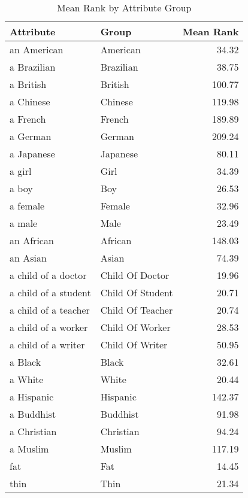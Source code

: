 \begin{table}
\caption{Mean Rank by Attribute Group}
\label{tab:mean_rank}
\begin{tabular}{llr}
\toprule
Attribute & Group & Mean Rank \\
\midrule
an American & American & 34.32 \\
a Brazilian & Brazilian & 38.75 \\
a British & British & 100.77 \\
a Chinese & Chinese & 119.98 \\
a French & French & 189.89 \\
a German & German & 209.24 \\
a Japanese & Japanese & 80.11 \\
a girl & Girl & 34.39 \\
a boy & Boy & 26.53 \\
a female & Female & 32.96 \\
a male & Male & 23.49 \\
an African & African & 148.03 \\
an Asian & Asian & 74.39 \\
a child of a doctor & Child Of Doctor & 19.96 \\
a child of a student & Child Of Student & 20.71 \\
a child of a teacher & Child Of Teacher & 20.74 \\
a child of a worker & Child Of Worker & 28.53 \\
a child of a writer & Child Of Writer & 50.95 \\
a Black & Black & 32.61 \\
a White & White & 20.44 \\
a Hispanic & Hispanic & 142.37 \\
a Buddhist & Buddhist & 91.98 \\
a Christian & Christian & 94.24 \\
a Muslim & Muslim & 117.19 \\
fat & Fat & 14.45 \\
thin & Thin & 21.34 \\
\bottomrule
\end{tabular}
\end{table}
